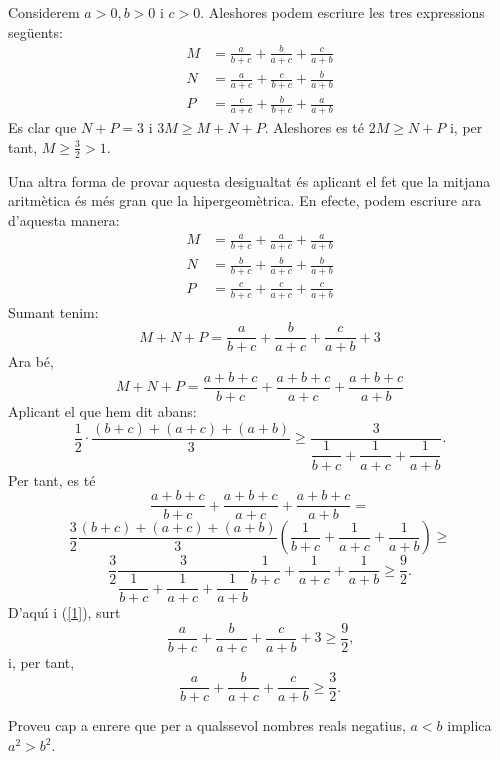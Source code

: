 \begin{solucio}
Considerem $a>0,b>0$ i $c>0$. Aleshores podem escriure les tres expressions
seg\"{u}ents:%
\begin{align*}
M  &  =\frac{a}{b+c}+\frac{b}{a+c}+\frac{c}{a+b}\\
N  &  =\frac{a}{a+c}+\frac{c}{b+c}+\frac{b}{a+b}\\
P  &  =\frac{c}{a+c}+\frac{b}{b+c}+\frac{a}{a+b}%
\end{align*}
Es clar que $N+P=3$ i $3M\geq M+N+P$. Aleshores es t\'{e} $2M\geq N+P$ i, per
tant, $M\geq\frac{3}{2}>1$.

Una altra forma de provar aquesta desigualtat \'{e}s aplicant el fet que la
mitjana aritm\`{e}tica \'{e}s m\'{e}s gran que la hipergeom\`{e}trica. En
efecte, podem escriure ara d'aquesta manera:
\begin{align*}
M  &  =\frac{a}{b+c}+\frac{a}{a+c}+\frac{a}{a+b}\\
N  &  =\frac{b}{b+c}+\frac{b}{a+c}+\frac{b}{a+b}\\
P  &  =\frac{c}{b+c}+\frac{c}{a+c}+\frac{c}{a+b}%
\end{align*}
Sumant tenim:%
\begin{equation}
M+N+P=\frac{a}{b+c}+\frac{b}{a+c}+\frac{c}{a+b}+3 \label{1}%
\end{equation}
Ara b\'{e},%
\[
M+N+P=\frac{a+b+c}{b+c}+\frac{a+b+c}{a+c}+\frac{a+b+c}{a+b}%
\]
Aplicant el que hem dit abans:\qquad%
\[
\frac{1}{2}\cdot\frac{(b+c)+(a+c)+(a+b)}{3}\geq\frac{3}{\dfrac{1}{b+c}%
+\dfrac{1}{a+c}+\dfrac{1}{a+b}}\text{.}%
\]
Per tant, es t\'{e}%
\[
\frac{a+b+c}{b+c}+\frac{a+b+c}{a+c}+\frac{a+b+c}{a+b}=
\]%
\[
\frac{3}{2}\frac{(b+c)+(a+c)+(a+b)}{3}\left(  \dfrac{1}{b+c}+\dfrac{1}%
{a+c}+\dfrac{1}{a+b}\right)  \geq
\]%
\[
\frac{3}{2}\frac{3}{\dfrac{1}{b+c}+\dfrac{1}{a+c}+\dfrac{1}{a+b}}\dfrac
{1}{b+c}+\dfrac{1}{a+c}+\dfrac{1}{a+b}\geq\frac{9}{2}\text{.}%
\]
D'aqu\'{\i} i (\ref{1}), surt%
\[
\frac{a}{b+c}+\frac{b}{a+c}+\frac{c}{a+b}+3\geq\frac{9}{2}\text{,}%
\]
i, per tant,%
\[
\frac{a}{b+c}+\frac{b}{a+c}+\frac{c}{a+b}\geq\frac{3}{2}\text{.}%
\]

\end{solucio}

\begin{exercici}
Proveu cap a enrere que per a qualssevol nombres reals negatius, $a<b$ implica
$a^{2}>b^{2}$.
\end{exercici}

